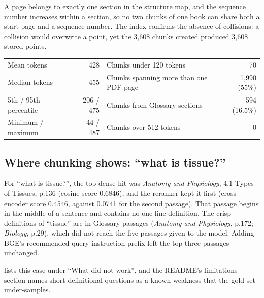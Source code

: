 \begin{inferred}
A page belongs to exactly one section in the structure map, and the sequence number increases within a section, so no two chunks of one book can share both a start page and a sequence number. The index confirms the absence of collisions: a collision would overwrite a point, yet the 3,608 chunks created produced 3,608 stored points.
\end{inferred}

\begin{measured}
\begin{center}\small
\begin{tabular}{@{}lr@{\quad}lr@{}}
\toprule
Mean tokens & 428 & Chunks under 120 tokens & 70\\
Median tokens & 455 & Chunks spanning more than one PDF page & 1,990 (55\%)\\
5th / 95th percentile & 206 / 475 & Chunks from Glossary sections & 594 (16.5\%)\\
Minimum / maximum & 44 / 487 & Chunks over 512 tokens & 0\\
\bottomrule
\end{tabular}
\end{center}
\end{measured}

\subsection{Where chunking shows: \enquote{what is tissue?}}

\begin{measured}
For \enquote{what is tissue?}, the top dense hit was \emph{Anatomy and Physiology}, 4.1 Types of Tissues, p.136 (cosine score 0.6846), and the reranker kept it first (cross-encoder score 0.4546, against 0.0741 for the second passage). That passage begins in the middle of a sentence and contains no one-line definition. The crisp definitions of \enquote{tissue} are in Glossary passages (\emph{Anatomy and Physiology}, p.172; \emph{Biology}, p.29), which did not reach the five passages given to the model. Adding BGE's recommended query instruction prefix left the top three passages unchanged.
\end{measured}

 lists this case under \enquote{What did not work}, and the README's limitations section names short definitional questions as a known weakness that the gold set under-samples.

